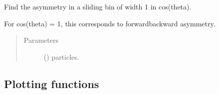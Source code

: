 \documentclass[letterpaper,10pt,english]{sphinxmanual}
\begin{document}
\begin{fulllineitems}
\label{\detokenize{analysis:scdc.analyze.plane_asymmetry}}
Find the asymmetry in a sliding bin of width 1 in cos(theta).

For cos(theta) = 1, this corresponds to forward\sphinxhyphen{}backward asymmetry.
\begin{quote}\begin{description}
\item[{Parameters}] \leavevmode
{} () \textendash{} particles.

\end{description}\end{quote}

\end{fulllineitems}



\subsection{Plotting functions}
\label{\detokenize{analysis:module-scdc.plot}}\label{\detokenize{analysis:plotting-functions}}
\end{document}
